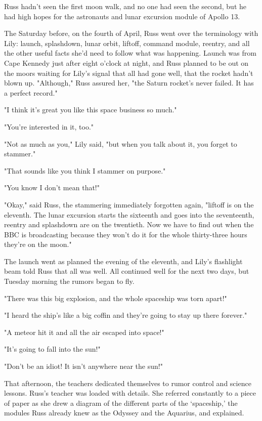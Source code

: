 Russ hadn't seen the first moon walk, and no one had seen the second, but he had high hopes for the astronauts and lunar excursion module of Apollo 13.

The Saturday before, on the fourth of April, Russ went over the terminology with Lily: launch, splashdown, lunar orbit, liftoff, command module, reentry, and all the other useful facts she'd need to follow what was happening. Launch was from Cape Kennedy just after eight o'clock at night, and Russ planned to be out on the moors waiting for Lily's signal that all had gone well, that the rocket hadn't blown up. "Although," Russ assured her, "the Saturn rocket's never failed. It has a perfect record."

"I think it's great you like this space business so much."

"You're interested in it, too."

"Not as much as you," Lily said, "but when you talk about it, you forget to stammer."

"That sounds like you think I{\el} stammer on purpose."

"You know I don't mean that!"

"Okay," said Russ, the stammering immediately forgotten again, "liftoff is on the eleventh. The lunar excursion starts the sixteenth and goes into the seventeenth, reentry and splashdown are on the twentieth. Now we have to find out when the BBC is broadcasting because they won't do it for the whole thirty-three hours they're on the moon."

The launch went as planned the evening of the eleventh, and Lily's flashlight beam told Russ that all was well. All continued well for the next two days, but Tuesday morning the rumors began to fly.

"There was this big explosion, and the whole spaceship was torn apart!"

"I heard the ship's like a big coffin and they're going to stay up there forever."

"A meteor hit it and all the air escaped into space!"

"It's going to fall into the sun!"

"Don't be an idiot! It isn't anywhere near the sun!"

That afternoon, the teachers dedicated themselves to rumor control and science lessons. Russ's teacher was loaded with details. She referred constantly to a piece of paper as she drew a diagram of the different parts of the `spaceship,' the modules Russ already knew as the Odyssey and the Aquarius, and explained.

